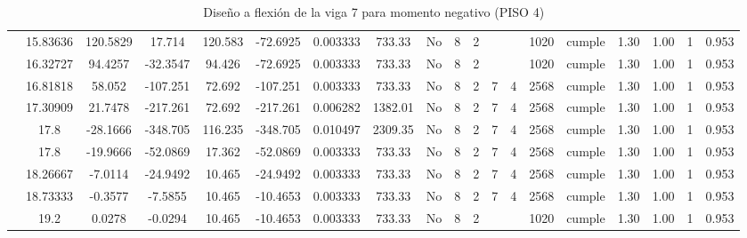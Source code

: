 \begin{table}[H]
{\begin{tabular}{|c|c|c|c|c|c|r|c|c|c|c|c|c|c|c|c|c|c|c|}
\cline{2-19}        & 15.83636 & 120.5829 & 17.714 & 120.583 & -72.6925 & 0.003333 & 733.33 & No  & 8   & 2   &     &     & 1020 & \cellcolor[rgb]{ .776,  .937,  .808}cumple & 1.30 & 1.00 & 1   & 0.953 \bigstrut\\
\cline{2-19}        & 16.32727 & 94.4257 & -32.3547 & 94.426 & -72.6925 & 0.003333 & 733.33 & No  & 8   & 2   &     &     & 1020 & \cellcolor[rgb]{ .776,  .937,  .808}cumple & 1.30 & 1.00 & 1   & 0.953 \bigstrut\\
\cline{2-19}        & 16.81818 & 58.052 & -107.251 & 72.692 & -107.251 & 0.003333 & 733.33 & No  & 8   & 2   & 7   & 4   & 2568 & \cellcolor[rgb]{ .776,  .937,  .808}cumple & 1.30 & 1.00 & 1   & 0.953 \bigstrut\\
\cline{2-19}        & 17.30909 & 21.7478 & -217.261 & 72.692 & -217.261 & 0.006282 & 1382.01 & No  & 8   & 2   & 7   & 4   & 2568 & \cellcolor[rgb]{ .776,  .937,  .808}cumple & 1.30 & 1.00 & 1   & 0.953 \bigstrut\\
\cline{2-19}        & \cellcolor[rgb]{ .851,  .882,  .949}17.8 & -28.1666 & -348.705 & 116.235 & -348.705 & 0.010497 & 2309.35 & No  & 8   & 2   & 7   & 4   & 2568 & \cellcolor[rgb]{ .776,  .937,  .808}cumple & 1.30 & 1.00 & 1   & 0.953 \bigstrut\\
\cline{2-19}        & \cellcolor[rgb]{ .851,  .882,  .949}17.8 & -19.9666 & -52.0869 & 17.362 & -52.0869 & 0.003333 & 733.33 & No  & 8   & 2   & 7   & 4   & 2568 & \cellcolor[rgb]{ .776,  .937,  .808}cumple & 1.30 & 1.00 & 1   & 0.953 \bigstrut\\
\cline{2-19}        & 18.26667 & -7.0114 & -24.9492 & 10.465 & -24.9492 & 0.003333 & 733.33 & No  & 8   & 2   & 7   & 4   & 2568 & \cellcolor[rgb]{ .776,  .937,  .808}cumple & 1.30 & 1.00 & 1   & 0.953 \bigstrut\\
\cline{2-19}        & 18.73333 & -0.3577 & -7.5855 & 10.465 & -10.4653 & 0.003333 & 733.33 & No  & 8   & 2   & 7   & 4   & 2568 & \cellcolor[rgb]{ .776,  .937,  .808}cumple & 1.30 & 1.00 & 1   & 0.953 \bigstrut\\
\cline{2-19}        & 19.2 & 0.0278 & -0.0294 & 10.465 & -10.4653 & 0.003333 & 733.33 & No  & 8   & 2   &     &     & 1020 & \cellcolor[rgb]{ .776,  .937,  .808}cumple & 1.30 & 1.00 & 1   & 0.953 \bigstrut\\
    \hline
    \end{tabular}%
    
  }
      \caption{Diseño a flexión de la viga 7 para momento negativo (PISO 4) }
  \label{tab:F VG7 P4 M-}%
\end{table}%
